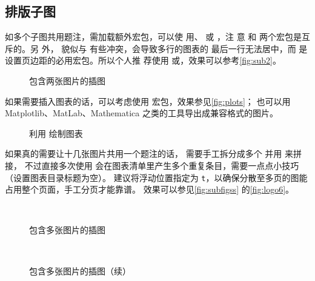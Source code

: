 \subsection{排版子图}

如多个子图共用题注，需加载额外宏包，可以使
用、 或 ，注
意 和 两个宏包是互斥的。另
外， 貌似与  有些冲突，会导致多行的图表的
最后一行无法居中，而  是设置页边距的必用宏包。所以个人推
荐使用 或，效果可以参考\autoref{fig:sub2}。

\begin{figure}[htb]
  \quad
  \caption{包含两张图片的插图}
  \label{fig:subfigs}
\end{figure}

如果需要插入图表的话，可以考虑使用  宏包，效果参见\autoref{fig:plots}；
也可以用 Matplotlib、MatLab、Mathematica 之类的工具导出成兼容格式的图片。

\begin{figure}[htb]
   \quad
  \caption{利用  绘制图表}
  \label{fig:plots}
\end{figure}

如果真的需要让十几张图片共用一个题注的话，
需要手工拆分成多个  并用  来拼接，
不过直接多次使用  会在图表清单里产生多个重复条目，需要一点点小技巧
（设置图表目录标题为空）。
建议将浮动位置指定为 \verb|t|，以确保分散至多页的图能占用整个页面，手工分页才能靠谱。
效果可以参见\autoref{fig:subfigss} 的\autoref{fig:logo6}。

\begin{figure}[t]
  \quad
  \\
  \quad
  \caption{包含多张图片的插图}
  \label{fig:subfigss}
\end{figure}
\begin{figure}[t]
  \ContinuedFloat
  \quad
  \\
  \quad
  \caption[]{包含多张图片的插图（续）}
\end{figure}

